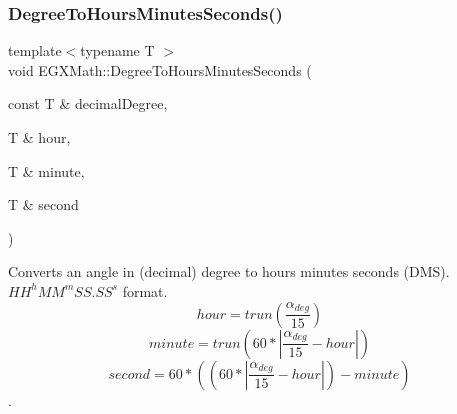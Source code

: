 \subsubsection{\texorpdfstring{Degree\+To\+Hours\+Minutes\+Seconds()}{DegreeToHoursMinutesSeconds()}}
{\footnotesize\ttfamily template$<$typename T $>$ \\
void E\+G\+X\+Math\+::\+Degree\+To\+Hours\+Minutes\+Seconds (\begin{DoxyParamCaption}\item[{const T \&}]{decimal\+Degree,  }\item[{T \&}]{hour,  }\item[{T \&}]{minute,  }\item[{T \&}]{second }\end{DoxyParamCaption})}



Converts an angle in (decimal) degree to hours minutes seconds (D\+MS). ${HH}^{h}{MM}^{m}{SS.SS}^{s}$ format. \[hour=trun(\frac{\alpha_{deg}}{15})\] \[minute=trun(60 * |\frac{\alpha_{deg}}{15} - hour|)\] \[second=60 * ((60 * |\frac{\alpha_{deg}}{15} - hour|)-minute)\]. 

